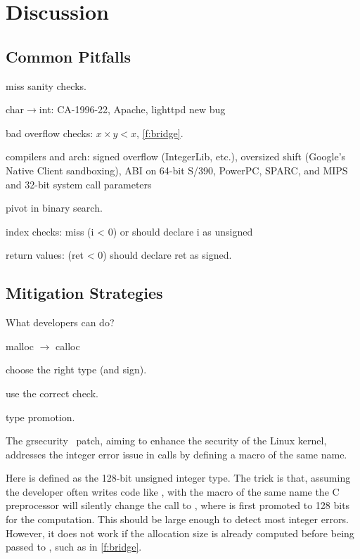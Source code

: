 \section{Discussion}
\label{s:disc}

\subsection{Common Pitfalls}

miss sanity checks.

char$\to$int: 
CA-1996-22,
Apache,
lighttpd new bug

bad overflow checks: $x \times y < x$, 
\autoref{f:bridge}.

compilers and arch:
signed overflow (IntegerLib, etc.),
oversized shift (Google's Native Client sandboxing),
ABI on 64-bit S/390, PowerPC, SPARC, and MIPS
and 32-bit system call parameters~\cite[CVE-2009-0029]{cve}

pivot in binary search.

index checks:
miss (i < 0) or should declare i as unsigned

return values: (ret < 0)
should declare ret as signed.

\subsection{Mitigation Strategies}

What developers can do?

malloc $\to$ calloc

choose the right type (and sign).

use the correct check.

type promotion.

The grsecurity~\cite{grsecurity} patch, aiming to enhance the
security of the Linux kernel, addresses the integer error issue
in  calls by defining a macro of the same name.
%

%
Here  is defined as the 128-bit unsigned integer
type.  The trick is that, assuming the developer often writes code
like , with the macro of the same name
the C preprocessor will silently change the call to
, where  is first
promoted to 128 bits for the computation.  This should be large
enough to detect most integer errors.  However, it does not work
if the allocation size is already computed before being passed to
, such as in \autoref{f:bridge}.

